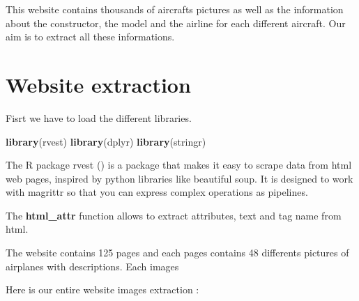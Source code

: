 \documentclass[]{book}
\newenvironment{Shaded}{\begin{snugshade}}{\end{snugshade}}
\newcommand{\KeywordTok}[1]{\textcolor[rgb]{0.13,0.29,0.53}{\textbf{#1}}}
\newcommand{\NormalTok}[1]{#1}
\begin{document}
This website contains thousands of aircrafts pictures as well as the information about the constructor, the model and the airline for each different aircraft. Our aim is to extract all these informations.

\hypertarget{website-extraction}{%
\section{Website extraction}\label{website-extraction}}

Fisrt we have to load the different libraries.

\begin{Shaded}
\begin{Highlighting}[]
\KeywordTok{library}\NormalTok{(rvest)}
\KeywordTok{library}\NormalTok{(dplyr)}
\KeywordTok{library}\NormalTok{(stringr)}
\end{Highlighting}
\end{Shaded}

The R package rvest (\citet{R-rvest}) is a package that makes it easy to scrape data from html web pages, inspired by python libraries like beautiful soup. It is designed to work with magrittr so that you can express complex operations as pipelines.

The \textbf{html\_attr} function allows to extract attributes, text and tag name from html.

The website contains 125 pages and each pages contains 48 differents pictures of airplanes with descriptions. Each images

Here is our entire website images extraction :
\end{document}

